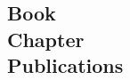 \documentclass[margin,line]{resume}
\begin{document}
\begin{resume}

    \section{\mysidestyle Book\\Chapter\\Publications}
      \begin{bibenum}
      \item {}
        \vspace{-2mm}
      \end{bibenum}
        \vspace{-1.5mm}

\end{resume}
\end{document}
